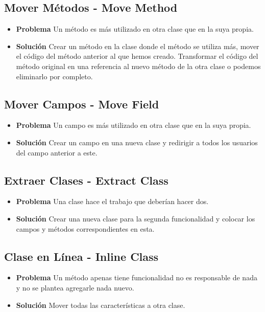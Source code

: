 \documentclass[11pt,a4paper,oneside]{book}
\begin{document}
\subsection{Mover Métodos - Move Method} 
\label{moveMethod}
\begin{itemize}
    \item \textbf{Problema} Un método es más utilizado en otra clase que en la suya propia.
    \item \textbf{Solución} Crear un método en la clase donde el método se utiliza más, mover el código del método anterior al que hemos creado. Transformar el código del método original en una referencia al nuevo método de la otra clase o podemos eliminarlo por completo.
\end{itemize}
    
\subsection{Mover Campos - Move Field}
\label{moveField}
\begin{itemize}
    \item \textbf{Problema} Un campo es más utilizado en otra clase que en la suya propia.
    \item \textbf{Solución} Crear un campo en una nueva clase y redirigir a todos los usuarios del campo anterior a este.
\end{itemize}
    
\subsection{Extraer Clases - Extract Class}
\begin{itemize}
    \item \textbf{Problema} Una clase hace el trabajo que deberían hacer dos.
    \item \textbf{Solución} Crear una nueva clase para la segunda funcionalidad y colocar los campos y métodos correspondientes en esta.
\end{itemize}
    
\subsection{Clase en Línea - Inline Class}
\label{inlineClass}
\begin{itemize}
    \item \textbf{Problema} Un método apenas tiene funcionalidad no es responsable de nada y no se plantea agregarle nada nuevo.
    \item \textbf{Solución} Mover todas las características a otra clase.
\end{itemize}
    
\end{document}
